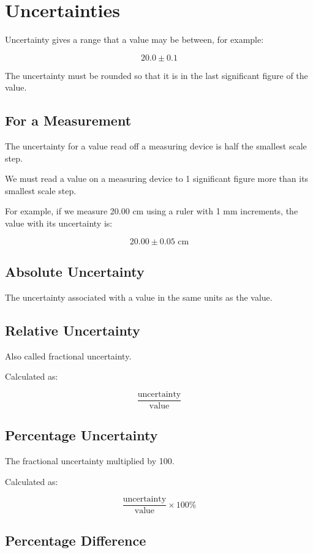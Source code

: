 \documentclass[a4paper,11pt]{article}
\begin{document}
\section{Uncertainties}

Uncertainty gives a range that a value may be between, for example:

$$
20.0 \pm 0.1
$$

The uncertainty must be rounded so that it is in the last significant figure of
the value.


\subsection{For a Measurement}

The uncertainty for a value read off a measuring device is half the smallest
scale step.

We must read a value on a measuring device to 1 significant figure more than its
smallest scale step.

For example, if we measure 20.00 cm using a ruler with 1 mm increments, the
value with its uncertainty is:

$$
20.00 \pm 0.05\text{ cm}
$$


\subsection{Absolute Uncertainty}

The uncertainty associated with a value in the same units as the value.


\subsection{Relative Uncertainty}

Also called fractional uncertainty.

Calculated as:

$$
\frac{\text{uncertainty}}{\text{value}}
$$


\subsection{Percentage Uncertainty}

The fractional uncertainty multiplied by 100.

Calculated as:

$$
\frac{\text{uncertainty}}{\text{value}} \times 100\%
$$


\subsection{Percentage Difference}
\end{document}
